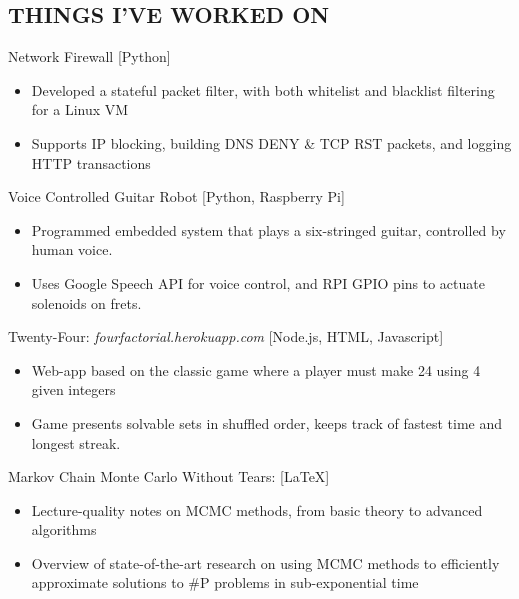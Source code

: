 \documentclass[line,mm]{res}
\begin{document}
\begin{resume}
    \section{THINGS I'VE WORKED ON}
     {\sc Network Firewall}  \hfill{[Python]}
	\begin{itemize} \itemsep -2pt
	\item Developed a stateful packet filter, with both whitelist and blacklist filtering for a Linux VM
	\item Supports IP blocking, building DNS DENY \& TCP RST packets, and logging HTTP transactions
	\end{itemize}
      \iffalse
    {\sc CloudRank} \hfill{[Python, NumPy]}
        \begin{itemize} \itemsep -2pt
        \item Allows Soundcloud users to find out who the most reputable tastemakers in their networks are.
        \item Discovers and ranks popular profiles in a user's Soundcloud follower network using PageRank
        \item Discovers a user's local network with Breadth First Search and spectral graph methods.
     \end{itemize}
\fi
\iftrue
    {\sc Voice Controlled Guitar Robot} \hfill{[Python, Raspberry Pi]}
    \begin{itemize}\itemsep -2pt
    \item Programmed embedded system that plays a six-stringed guitar, controlled by human voice.
    \item Uses Google Speech API for voice control, and RPI GPIO pins to actuate solenoids on frets.
    \end{itemize}
\fi
    {\sc Twenty-Four:} \textit{fourfactorial.herokuapp.com} \hfill{[Node.js, HTML, Javascript]}
        \begin{itemize} \itemsep -2pt
        \item Web-app based on the classic game where a player must make 24 using 4 given integers
        \item Game presents solvable sets in shuffled order, keeps track of fastest time and longest streak.
        \end{itemize}
    {\sc Markov Chain Monte Carlo Without Tears:} \hfill{[\LaTeX]}
        \begin{itemize} \itemsep -2pt
        \item Lecture-quality notes on MCMC methods, from basic theory to advanced algorithms
        \item Overview of state-of-the-art research on using MCMC methods to efficiently approximate solutions to \#P problems in sub-exponential time
        \end{itemize}
\iffalse
    {\sc I Want to Love You But I Don't Know If I Can: A Defense of Coldplay}
        \begin{itemize} \itemsep -2pt
        \item Extensively researched critique of modern music commentary, from national magazines to vlogs
        \item A plea for why it should be okay to like Coldplay
        \end{itemize}
\fi
\iftrue

\end{resume}
\end{document}
